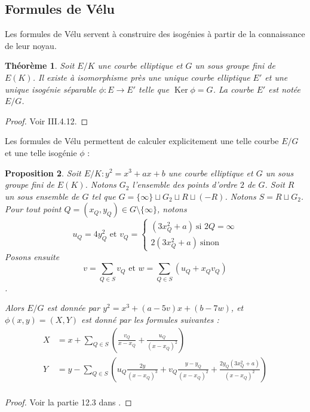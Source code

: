\documentclass{article}
\theoremstyle{plain}%
\newtheorem{thm}{Théorème}[section]
\newtheorem{prop}[thm]{Proposition}
\theoremstyle{definition}%
\DeclareMathOperator{\Ker}{Ker}
\begin{document}
\subsection{Formules de Vélu}

Les formules de Vélu servent à construire des isogénies à partir de la connaissance de leur noyau. 

\begin{thm}
  \label{isoker}
  Soit $E/K$ une courbe elliptique et $G$ un sous groupe fini de $E(K)$. Il existe à isomorphisme près une unique courbe elliptique $E'$ et une unique isogénie séparable $\phi : E \to E'$ telle que $\Ker \phi = G$. La courbe $E'$ est notée $E/G$.
\end{thm}

\begin{proof}
  Voir \cite{Silverman} III.4.12.
\end{proof}

Les formules de Vélu permettent de calculer explicitement une telle courbe $E/G$ et une telle isogénie $\phi$ : 
\begin{prop}
  Soit $E/K : y^2 = x^3 +ax +b$ une courbe elliptique et $G$ un sous groupe fini de $E(K)$. Notons $G_2$ l'ensemble des points d'ordre $2$ de $G$. Soit $R$ un sous ensemble de $G$ tel que $G = \{\infty\}  \sqcup G_2 \sqcup R \sqcup (-R)$. Notons $S = R \sqcup G_2$.
  Pour tout point $Q=(x_Q, y_Q)\in G\setminus \{\infty\}$, notons 
  $$u_Q = 4y_Q^2  \text{\ \ et\ \ }     
  v_Q = 
    \begin{cases}
      (3x_Q^2 + a)\ \text{si $2Q = \infty$}\\ 
      2(3x_Q^2 + a)\ \text{sinon}
    \end{cases}$$
    Posons ensuite $$v = \sum_{Q\in S}v_Q   \text{\ \ et\ \ } w  = \sum_{Q\in S}(u_Q + x_Qv_Q)$$.

    Alors $E/G$ est donnée par $y^2 = x^3 + (a-5v)x + (b-7w)$, et $\phi (x, y) = (X, Y)$ est donné par les formules suivantes :
\begin{align*}
  X &= x + \sum_{Q\in S}\left( \frac{v_Q}{x-x_Q} + \frac{u_Q}{(x-x_Q)^2} \right)\\
  Y &= y - \sum_{Q\in S}\left( u_Q\frac{2y}{(x-x_Q)^3} + v_Q\frac{y-y_Q}{(x-x_Q)^2} + \frac{2y_Q(3x_Q^2 +a)}{(x-x_Q)^2} \right)\\
\end{align*}
 \end{prop}

\begin{proof}
  Voir la partie 12.3 dans \cite{Washington}. 
\end{proof}
\end{document}

